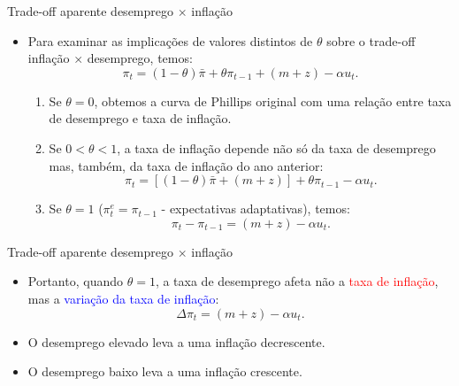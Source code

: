 \documentclass[10pt]{beamer}
\begin{document}
\begin{frame}{Trade-off aparente desemprego $\times$ inflação}
    \begin{itemize}
        \item Para examinar as implicações de valores distintos de $\theta$ sobre o trade-off inflação $\times$ desemprego, temos:
        \begin{equation}
            \pi_t = (1 - \theta) \bar{\pi} + \theta \pi_{t-1} + (m + z) - \alpha u_t.
            \label{eq9}
        \end{equation}
        \bigskip
        \begin{enumerate}
            \item Se $\theta = 0$, obtemos a curva de Phillips original com uma relação entre taxa de desemprego e taxa de inflação.
            \bigskip
            \item Se $0 < \theta < 1$, a taxa de inflação depende não só da taxa de desemprego mas, também, da taxa de inflação do ano anterior:
            \[
            \pi_t = [(1 - \theta) \bar{\pi} + (m + z)] + \theta \pi_{t-1}  - \alpha u_t.
            \]
            \bigskip
            \item Se $\theta = 1$ ($\pi_t^e = \pi_{t-1}$ - expectativas adaptativas), temos:
            \begin{equation}
            \pi_t - \pi_{t-1} = (m + z) - \alpha u_t.
            \label{eq10}
            \end{equation}
        \end{enumerate}
    \end{itemize}
\end{frame}

\begin{frame}{Trade-off aparente desemprego $\times$ inflação}
    \begin{itemize}
        \item Portanto, quando $\theta = 1$, a taxa de desemprego afeta não a \textcolor{red}{taxa de inflação}, mas a \textcolor{blue}{variação da taxa de inflação}:
        \[
        \Delta \pi_t = (m + z) - \alpha u_t.
        \]
        \bigskip
        \item O desemprego elevado leva a uma inflação decrescente.
        \bigskip
        \item O desemprego baixo leva a uma inflação crescente.
    \end{itemize}
\end{frame}
\end{document}
